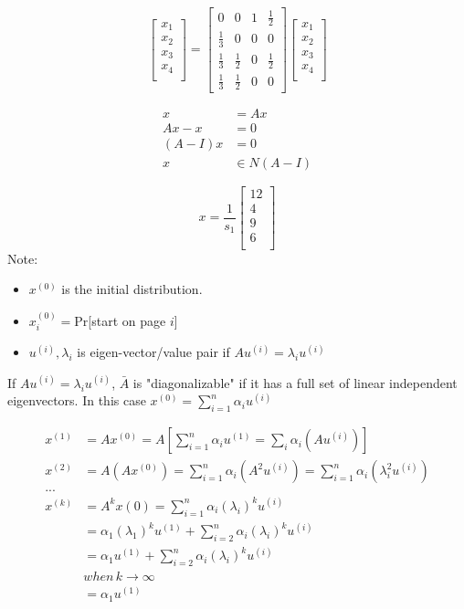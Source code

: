 $$
\left[
\begin{matrix}
x_1 \\
x_2 \\
x_3\\
x_4\\
\end{matrix}
\right] =
\left[
\begin{matrix}
0 & 0 & 1 & \frac{1}{2} \\
\frac{1}{3} & 0 & 0& 0 \\
\frac{1}{3}& \frac{1}{2} & 0 & \frac{1}{2} \\
\frac{1}{3} & \frac{1}{2} & 0 & 0 
\end{matrix}
\right]
\left[
\begin{matrix}
x_1 \\
x_2 \\
x_3\\
x_4\\
\end{matrix}
\right]
$$

\begin{align*}
x &= Ax \\
Ax - x &= 0\\
(A - I)x &= 0\\
x&\in N(A-I)
\end{align*}


$$
x = \frac{1}{s_1}
\left[
\begin{matrix}
12 \\
4 \\
9\\
6\\
\end{matrix}
\right]
$$
Note: 

\begin{itemize}
	\item $x^{(0)}$ is the initial distribution.
	
	\item $x^{(0)}_i = $Pr[start on page $i$]
	
	\item $u^{(i)}, \lambda_i$ is eigen-vector/value pair if $Au^{(i)} = \lambda_iu^{(i)}$
\end{itemize}


If $Au^{(i)} = \lambda_iu^{(i)}$, $\bar{A}$ is "diagonalizable" if it has a full set of linear independent eigenvectors. In this case $x^{(0)} = \sum^n_{i=1}\alpha_iu^{(i)}$

\begin{align*}
x^{(1)} &= Ax^{(0)} = A[\sum^n_{i=1}\alpha_iu^{(1)} = \sum_i\alpha_i(Au^{(i)})]\\
x^{(2)} &= A(Ax^{(0)}) = \sum^n_{i=1}\alpha_i(A^2u^{(i)}) = \sum^n_{i=1}\alpha_i(\lambda_i^2u^{(i)})\\
...\\
x^{(k)} &= A^kx{(0)} = \sum^n_{i=1}\alpha_i(\lambda_i)^ku^{(i)}\\
&= \alpha_1(\lambda_1)^ku^{(1)} + \sum^n_{i=2}\alpha_i(\lambda_i)^ku^{(i)} \\
&= \alpha_1u^{(1)} + \sum^n_{i=2}\alpha_i(\lambda_i)^ku^{(i)}\\
&when \,k \rightarrow \infty\\
&= \alpha_1u^{(1)}
\end{align*}

